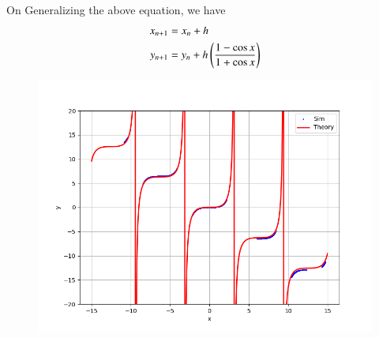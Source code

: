 \documentclass[journal]{IEEEtran}
\numberwithin{equation}{enumi}
\numberwithin{figure}{enumi}
\begin{document}
On Generalizing the above equation, we have 
\begin{align}
    x_{n+1}&=x_{n} +h \\
    y_{n+1}&= y_{n}+h\left(\frac{1-\cos{x}}{1+\cos{x}}\right)  
\end{align}

\begin{figure}[h!]
   \centering
   \includegraphics[width=\columnwidth]{figs/Fig1.png}
\end{figure}
\end{document}
